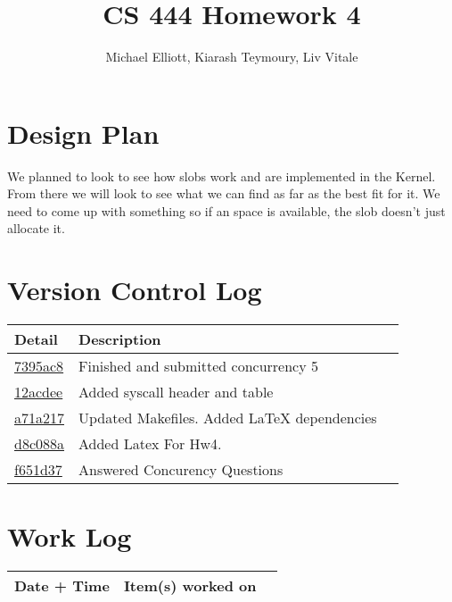 \documentclass[letterpaper,10pt,titlepage,draftclsnofoot,onecolumn]{IEEEtran}
\title{CS 444 Homework 4}
\author{Michael Elliott, Kiarash Teymoury, Liv Vitale}
\begin{document}
\section{Design Plan}

\par We planned to look to see how slobs work and are implemented in the Kernel. From there we will 
look to see what we can find as far as the best fit for it. We need to come up with something so if an space is available, the slob doesn't just allocate it.

\section{Version Control Log}

\begin{tabular}{l l l}\textbf{Detail}  & \textbf{Description}\\\hline
\href{https://github.com/elliomic/CS-444/commit/7395ac889572508fb893198084f6f89186e6cfa1}{7395ac8} &  Finished and submitted concurrency 5\\\hline

\href{https://github.com/elliomic/CS-444/commit/12acdee67ef6384d8f95e9899ff6ebbfd74de61e}{12acdee} & Added syscall header and table\\\hline

\href{https://github.com/elliomic/CS-444/commit/f264f4bb36821131ad6a4cad491bc88dd4368da9}{a71a217} & Updated Makefiles. Added LaTeX dependencies\\\hline

\href{https://github.com/elliomic/CS-444/commit/d8c088aa0b512484a45a62e2ffd0e0533d1cbf8d}{d8c088a} &Added Latex For Hw4.\\\hline

\href{https://github.com/elliomic/CS-444/commit/f651d37b2422b4ebd25687f7ac8c456b618ddb45}{f651d37} & Answered Concurency Questions\\\hline


\end{tabular}

\section{Work Log}
\begin{tabular}{l | c | r}
Date + Time & Item(s) worked on \\
\hline

\end{tabular}
\end{document}
